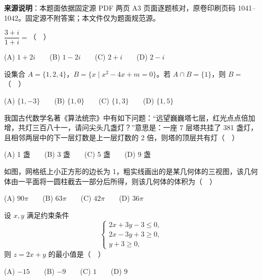 


\begin{gktip}
\textbf{来源说明}：本题面依据固定源 PDF 两页 A3 页面逐题核对，原卷印刷页码 1041–1042。固定源不附答案；本文件仅为题面规范源。
\end{gktip}


\begin{question}
\(\dfrac{3+i}{1+i}=\)（　）

   (A) \(1+2i\)　　(B) \(1-2i\)　　(C) \(2+i\)　　(D) \(2-i\)

\end{question}
\begin{question}
设集合 \(A=\{1,2,4\}\)，\(B=\{x\mid x^2-4x+m=0\}\)。若 \(A\cap B=\{1\}\)，则 \(B=\)（　）

   (A) \(\{1,-3\}\)　　(B) \(\{1,0\}\)　　(C) \(\{1,3\}\)　　(D) \(\{1,5\}\)

\end{question}
\begin{question}
我国古代数学名著《算法统宗》中有如下问题：“远望巍巍塔七层，红光点点倍加增，共灯三百八十一，请问尖头几盏灯？”意思是：一座 7 层塔共挂了 381 盏灯，且相邻两层中的下一层灯数是上一层灯数的 2 倍，则塔的顶层共有灯（　）

   (A) 1 盏　　(B) 3 盏　　(C) 5 盏　　(D) 9 盏

\Needspace{0.4\textheight}
\end{question}
\begin{question}
如图，网格纸上小正方形的边长为 1，粗实线画出的是某几何体的三视图，该几何体由一平面将一圆柱截去一部分后所得，则该几何体的体积为（　）
\nopagebreak[4]
\begin{center}\end{center}
\nopagebreak[4]
   (A) \(90\pi\)　　(B) \(63\pi\)　　(C) \(42\pi\)　　(D) \(36\pi\)

\end{question}
\begin{question}
设 \(x,y\) 满足约束条件
\nopagebreak[4]
\[
   \begin{cases}
   2x+3y-3\leq 0,\\
   2x-3y+3\geq 0,\\
   y+3\geq 0,
   \end{cases}
\]
   则 \(z=2x+y\) 的最小值是（　）

   (A) \(-15\)　　(B) \(-9\)　　(C) \(1\)　　(D) \(9\)

\end{question}
